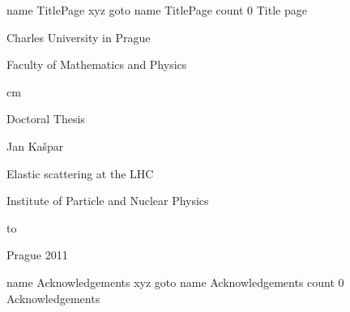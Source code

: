 







\let\BiggerFonts\SetFontSizesXII
\let\NormalFonts\SetFontSizesX
\let\SmallerFonts\SetFontSizesVIII

\NormalFonts

\ParIndent=5mm

\Reftrue
\Toctrue


\pageamp=5mm

\def\linkColor{\cmykBlue}


\def\pmt#1{{\tt #1}}



\pdfdest name {TitlePage} xyz
\pdfoutline goto name {TitlePage} count 0 {Title page}%


\centerline{\fPbxiv Charles University in Prague}
\centerline{\fPbxiv Faculty of Mathematics and Physics}
	cm
\centerline{\fPbxx Doctoral Thesis}
\vskip1cm
\centerline{}
\vskip3cm
\centerline{\fPbxiv Jan Ka\v spar}
\vskip1cm
\centerline{\fPbxx Elastic scattering at the LHC}
\centerline{\fPbxx\FootText}
\vskip2cm
\centerline{\fPbxiv Institute of Particle and Nuclear Physics}
\ialign to
\vskip2cm
\centerline{\fPbxiv Prague 2011}

\vfil\eject
\forceoddpage


\pdfdest name {Acknowledgements} xyz
\pdfoutline goto name {Acknowledgements} count 0 {Acknowledgements}%

